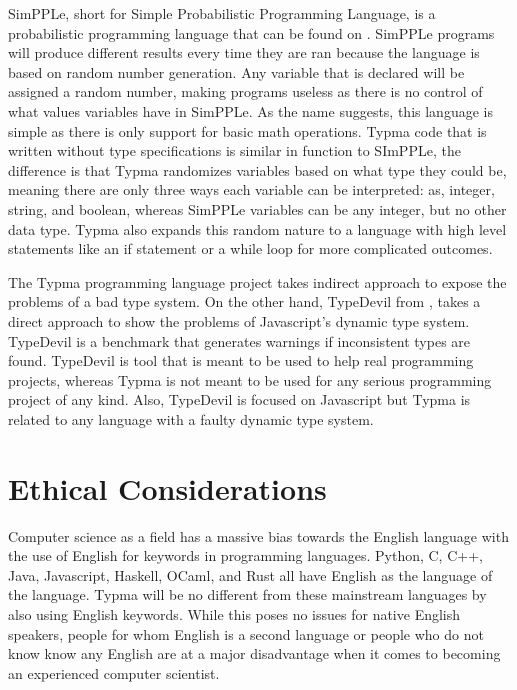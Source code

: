 \documentclass[10pt,twocolumn]{article}
\begin{document}
SimPPLe, short for Simple Probabilistic Programming Language, is a probabilistic programming language that can be found on \textcite{SimPPLe}. SimPPLe programs will produce different results every time they are ran because the language is based on random number generation. Any variable that is declared will be assigned a random number, making programs useless as there is no control of what values variables have in SimPPLe. As the name suggests, this language is simple as there is only support for basic math operations. Typma code that is written without type specifications is similar in function to SImPPLe, the difference is that Typma randomizes variables based on what type they could be, meaning there are only three ways each variable can be interpreted: as, integer, string, and boolean, whereas SimPPLe variables can be any integer, but no other data type. Typma also expands this random nature to a language with high level statements like an if statement or a while loop for more complicated outcomes.

The Typma programming language project takes indirect approach to expose the problems of a bad type system. On the other hand, TypeDevil from \textcite{Pradel2014TypeDevil}, takes a direct approach to show the problems of Javascript's dynamic type system. TypeDevil is a benchmark that generates warnings if inconsistent types are found. TypeDevil is tool that is meant to be used to help real programming projects, whereas Typma is not meant to be used for any serious programming project of any kind. Also, TypeDevil is focused on Javascript but Typma is related to any language with a faulty dynamic type system. 

\section{Ethical Considerations}

Computer science as a field has a massive bias towards the English language with the use of English for keywords in programming languages. Python, C, C++, Java, Javascript, Haskell, OCaml, and Rust all have English as the language of the language. Typma will be no different from these mainstream languages by also using English keywords. While this poses no issues for native English speakers, people for whom English is a second language or people who do not know know any English are at a major disadvantage when it comes to becoming an experienced computer scientist. 
\end{document}
